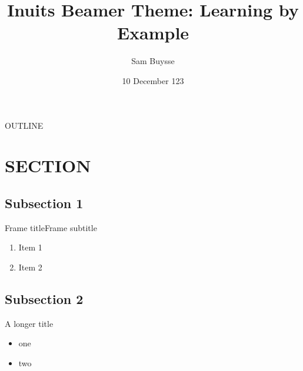 \documentclass[aspectratio=169]{beamer}
\title{Inuits Beamer Theme: Learning by Example}
\date{10 December 123}
\author{Sam Buysse}
\begin{document}
\begin{frame}
    \titlepage
\end{frame}

\begin{frame}[plain]{OUTLINE}
    \addtocounter{framenumber}{-1}
    \tableofcontents
\end{frame}

\section{SECTION}
\begin{frame}[plain]
    \sectionpage
\end{frame}

\subsection{Subsection 1}
\begin{frame}{Frame title}{Frame subtitle}
    \begin{enumerate}
        \item Item 1
        \item Item 2
    \end{enumerate}
\end{frame}

\subsection{Subsection 2}
\begin{frame}{A longer title}
    \begin{itemize}
        \item one
        \item two
    \end{itemize}
\end{frame}

\begin{frame}[plain]
    \endcard
\end{frame}
\end{document}
